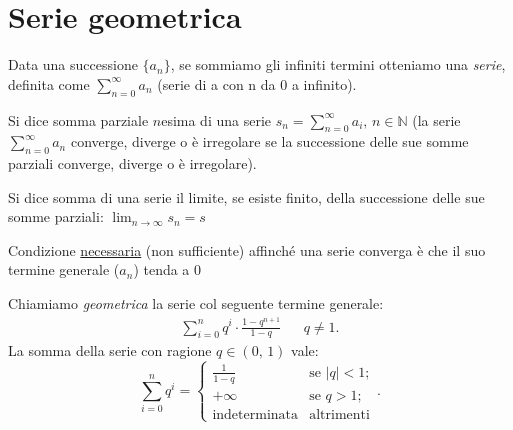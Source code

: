     \section{Serie geometrica}
    \begin{defn}[Serie]
        Data una successione $\{a_{n}\}$, se sommiamo gli infiniti termini otteniamo una \emph{serie}, definita come $\sum_{n=0}^{\infty} a_n$ (serie di a con n da 0 a infinito).

        Si dice somma parziale $n$\nbdash esima di una serie $s_{n}=\sum_{n=0}^{\infty} a_i,\,n \in \mathbb{N}$ (la serie $\sum_{n=0}^{\infty} a_n$ converge, diverge o è irregolare se la successione delle sue somme parziali converge, diverge o è irregolare).

        Si dice somma di una serie il limite, se esiste finito, della successione delle sue somme parziali: $\lim_{n \to \infty} s_n = s$

        Condizione \underline{necessaria} (non sufficiente) affinché una serie converga è che il suo termine generale ($a_n$) tenda a 0
    \end{defn}
    \begin{defn}\label{defn:Serie_geometrica}
        Chiamiamo \emph{geometrica} la serie col seguente termine generale:
        \begin{align*}
            \sum_{i=0}^{n} q^{i} \cdot \frac{1 - q^{n+1}}{1 - q} & &q\neq 1
        .\end{align*}
        La somma della serie con ragione $q \in (0,\,1)$ vale: \[
            \sum_{i=0}^{n} q^{i} = \begin{cases}
                \frac{1}{1-q} & \text{se $|q| < 1$}; \\
                +\infty & \text{se $q > 1$}; \\
                \text{indeterminata} & \text{altrimenti}
            \end{cases}
        .\] 
    \end{defn}
